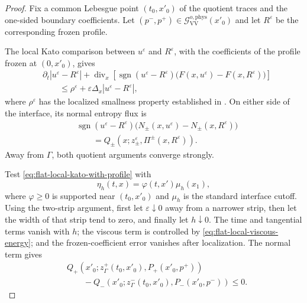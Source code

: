 \documentclass[11pt]{amsart}
\numberwithin{equation}{section}
\theoremstyle{plain}
\theoremstyle{definition}
\theoremstyle{remark}
\begin{document}
\begin{proof}
Fix a common Lebesgue point \((t_0,x'_0)\) of the quotient traces and the
one-sided boundary coefficients. Let
\((p^-,p^+)\in\mathcal G_{\mathrm{VV}}^{o,\mathrm{phys}}(x'_0)\) and let
\(R^\varepsilon\) be the corresponding frozen profile.

The local Kato comparison between \(u^\varepsilon\) and \(R^\varepsilon\),
with the coefficients of the profile frozen at \((0,x'_0)\), gives
\begin{equation}
\label{eq:flat-local-kato-with-profile}
\begin{aligned}
&\partial_t|u^\varepsilon-R^\varepsilon|
+
\operatorname{div}_x
\left[
    \operatorname{sgn}(u^\varepsilon-R^\varepsilon)
    \bigl(F(x,u^\varepsilon)-F(x,R^\varepsilon)\bigr)
\right]
\\
&\qquad\leq
    \rho^\varepsilon
    +
    \varepsilon\Delta_x|u^\varepsilon-R^\varepsilon|,
\end{aligned}
\end{equation}
where \(\rho^\varepsilon\) has the localized smallness property established
in \cite[Lemmas~6--7]{AM}. On either side of the interface, its normal
entropy flux is
\begin{equation}
\label{eq:flat-profile-flux-quotient}
\begin{aligned}
&\operatorname{sgn}(u^\varepsilon-R^\varepsilon)
\bigl(
    N_\pm(x,u^\varepsilon)-N_\pm(x,R^\varepsilon)
\bigr)
\\
&\qquad=
Q_\pm
\left(
    x;
    z_\pm^\varepsilon,
    \Pi^\pm(x,R^\varepsilon)
\right).
\end{aligned}
\end{equation}
Away from \(\Gamma\), both quotient arguments converge strongly.

Test \eqref{eq:flat-local-kato-with-profile} with
\[
    \eta_h(t,x)=\varphi(t,x')\mu_h(x_1),
\]
where \(\varphi\geq0\) is supported near \((t_0,x'_0)\) and \(\mu_h\) is
the standard interface cutoff. Using the two-strip argument, first let
\(\varepsilon\downarrow0\) away from a narrower strip, then let the width of
that strip tend to zero, and finally let \(h\downarrow0\). The time and
tangential terms vanish with \(h\); the viscous term is controlled by
\eqref{eq:flat-local-viscous-energy}; and the frozen-coefficient error
vanishes after localization. The normal term gives
\begin{equation}
\label{eq:flat-compatibility-elementary-profile}
\begin{aligned}
&Q_+
\left(
    x'_0;
    z^+_\Gamma(t_0,x'_0),
    P_+(x'_0,p^+)
\right)
\\
&\qquad-
Q_-
\left(
    x'_0;
    z^-_\Gamma(t_0,x'_0),
    P_-(x'_0,p^-)
\right)
\leq0.
\end{aligned}
\end{equation}


\end{proof}
\end{document}
